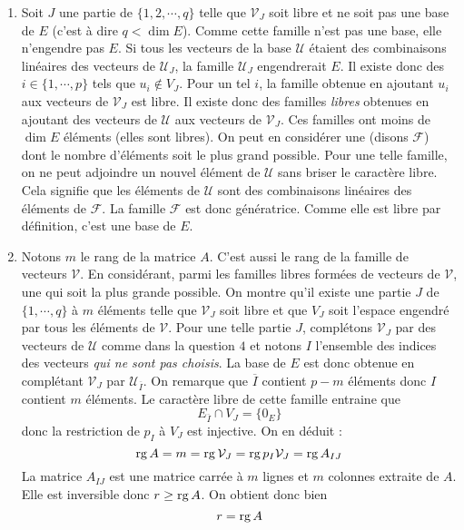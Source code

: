 \begin{enumerate}
\item Soit $J$ une partie de $\{1,2,\cdots,q\}$ telle que $\mathcal V_J$ soit libre et ne soit pas une base de $E$ (c'est à dire $q<\dim E$).\newline
Comme cette famille n'est pas une base, elle n'engendre pas $E$. Si tous les vecteurs de la base $\mathcal U$ étaient des combinaisons linéaires des vecteurs de $\mathcal U_J$, la famille  $\mathcal U_J$ engendrerait $E$. Il existe donc des $i\in\{1,\cdots,p\}$ tels que $u_i\not\in V_J$. Pour un tel $i$, la famille obtenue en ajoutant $u_i$ aux vecteurs de $\mathcal V_J$ est libre.\newline
Il existe donc des familles \emph{libres} obtenues en ajoutant des vecteurs de $\mathcal U$ aux vecteurs de $\mathcal V_J$. Ces familles ont moins de $\dim E$ éléments (elles sont libres). On peut en considérer une (disons $\mathcal F$) dont le nombre d'éléments soit le plus grand possible.\newline
Pour une telle famille, on ne peut adjoindre un nouvel élément de $\mathcal U$ sans briser le caractère libre.\newline
Cela signifie que les éléments de $\mathcal U$ sont des combinaisons linéaires des éléments de $\mathcal F$. La famille $\mathcal F$ est donc génératrice.\newline
Comme elle est libre par définition, c'est une base de $E$. 
\item Notons $m$ le rang de la matrice $A$.\newline
C'est aussi le rang de la famille de vecteurs $\mathcal V$. En considérant, parmi les familles libres formées de vecteurs de $\mathcal V$, une qui soit la plus grande possible. On montre qu'il existe une partie $J$ de $\{1,\cdots,q\}$ à $m$ éléments telle que $\mathcal V_J$ soit libre et que $V_J$ soit l'espace engendré par tous les éléments de $\mathcal V$.\newline
Pour une telle partie $J$, complétons $\mathcal V_J$ par des vecteurs de $\mathcal U$ comme dans la question $4$ et notons $I$ l'ensemble des indices des vecteurs \emph{qui ne sont pas choisis}.\newline
La base de $E$ est donc obtenue en complétant $\mathcal V_J$ par $\mathcal U_{\overline{I}}$. On remarque que $\overline{I}$ contient $p-m$ éléments donc $I$ contient $m$ éléments.\newline
Le caractère libre de cette famille entraine que
\begin{displaymath}
 E_{\overline{I}}\cap V_J = \{0_E\} 
\end{displaymath}
donc la restriction de $p_I$ à $V_J$  est injective. On en déduit :
\begin{displaymath}
 \operatorname{rg} A = m = \operatorname{rg} \mathcal V_J = \operatorname{rg} p_I \mathcal V_J = \operatorname{rg} A_{IJ}
\end{displaymath}
La matrice $A_{IJ}$ est une matrice carrée à $m$ lignes et $m$ colonnes extraite de $A$. Elle est inversible donc $r\geq \operatorname{rg} A$. On obtient donc bien
\begin{displaymath}
 r = \operatorname{rg} A
\end{displaymath}

\end{enumerate}
